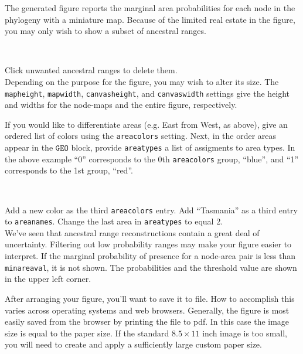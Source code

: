 \documentclass[11pt]{article}
\newcommand{\impmark}{\strut\vadjust{\domark}}
\newcommand{\domark}{%
  \vbox to 0pt{
    \kern-\dp\strutbox
    \smash{\llap{$\rightarrow$\kern1em}}
    \vss
  }%
}
\begin{document}
The generated figure reports the marginal area probabilities for each node in the phylogeny with a miniature map.
Because of the limited real estate in the figure, you may only wish to show a subset of ancestral ranges.

\noindent \\ \impmark  Click unwanted ancestral ranges to delete them. \\

Depending on the purpose for the figure, you may wish to alter its size.
The \texttt{mapheight}, \texttt{mapwidth}, \texttt{canvasheight}, and \texttt{canvaswidth} settings give the height and widths for the node-maps and the entire figure, respectively.

If you would like to differentiate areas (e.g. East from West, as above), give an ordered list of colors using the \texttt{areacolors} setting.
Next, in the order areas appear in the $\texttt{GEO}$ block, provide \texttt{areatypes} a list of assigments to area types.
In the above example ``0'' corresponds to the 0th \texttt{areacolors} group, ``blue'', and ``1'' corresponds to the 1st group, ``red''.

\noindent \\ \impmark Add a new color as the third \texttt{areacolors} entry. Add ``Tasmania'' as a third entry to \texttt{areanames}. Change the last area in \texttt{areatypes} to equal 2. \\

We've seen that ancestral range reconstructions contain a great deal of uncertainty.
Filtering out low probability ranges may make your figure easier to interpret.
If the marginal probability of presence for a node-area pair is less than \texttt{minareaval}, it is not shown.
The probabilities and the threshold value are shown in the upper left corner.

After arranging your figure, you'll want to save it to file.
How to accomplish this varies across operating systems and web browsers.
Generally, the figure is most easily saved from the browser by printing the file to pdf.
In this case the image size is equal to the paper size.
If the standard $8.5 \times 11$ inch image is too small, you will need to create and apply a sufficiently large custom paper size.



\end{document}
